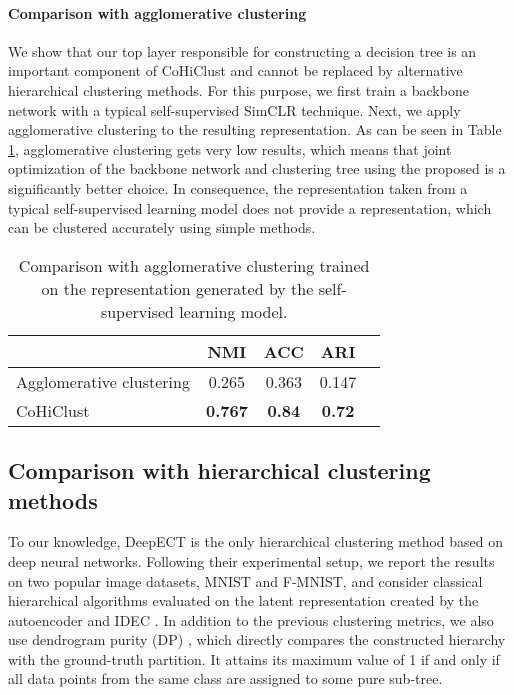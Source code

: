 \documentclass[runningheads]{llncs}
\def\our{CoHiClust}
\begin{document}
\paragraph{Comparison with agglomerative clustering} 

We show that our top layer responsible for constructing a decision tree is an important component of \our{} and cannot be replaced by alternative hierarchical clustering methods. For this purpose, we first train a backbone network with a typical self-supervised SimCLR technique. Next, we apply agglomerative clustering to the resulting representation. As can be seen in Table \ref{tab:agl}, agglomerative clustering gets very low results, which means that joint optimization of the backbone network and clustering tree using the proposed  is a significantly better choice. In consequence, the representation taken from a typical self-supervised learning model does not provide a representation, which can be clustered accurately using simple methods.


\begin{table}[!ht]
\centering
\caption{Comparison with agglomerative clustering trained on the representation generated by the self-supervised learning model. \label{tab:agl}}
\begin{tabular}{ lcccc }
\toprule
 & NMI & ACC & ARI\\
\midrule
Agglomerative clustering & 0.265 & 0.363 & 0.147\\
\our{} & {\bf 0.767} & {\bf 0.84} & {\bf 0.72}\\
\bottomrule
\end{tabular}
\end{table}

 

\subsection{Comparison with hierarchical clustering methods}



To our knowledge, DeepECT \cite{mautz2019deep} is the only hierarchical clustering method based on deep neural networks. Following their experimental setup, we report the results on two popular image datasets, MNIST and F-MNIST, and consider classical hierarchical algorithms evaluated on the latent representation created by the autoencoder and IDEC \cite{guo2017improved}. In addition to the previous clustering metrics, we also use dendrogram purity (DP) \cite{kobren2017hierarchical,yang2019online}, which directly compares the constructed hierarchy with the ground-truth partition. It attains its maximum value of 1 if and only if all data points from the same class are assigned to some pure sub-tree.
\end{document}
